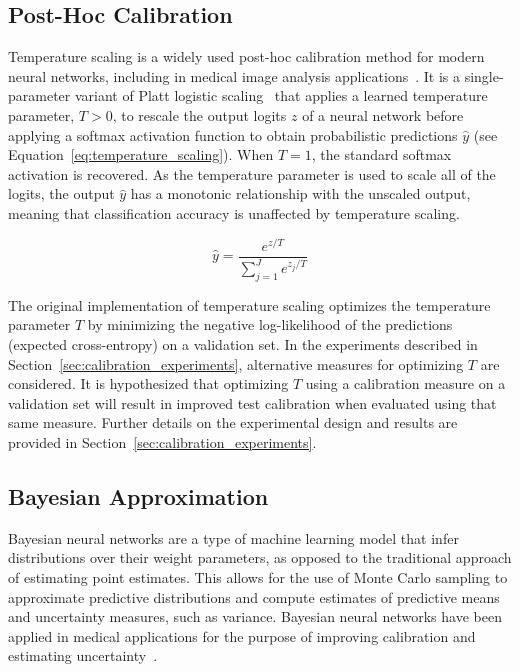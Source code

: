 \subsection{Post-Hoc Calibration}
Temperature scaling is a widely used post-hoc calibration method for modern neural networks, including in medical image analysis applications~\cite{guo2017calibration,liang2020improved}. It is a single-parameter variant of Platt logistic scaling~\cite{platt1999probabilistic} that applies a learned temperature parameter, $T > 0$, to rescale the output logits $z$ of a neural network before applying a softmax activation function to obtain probabilistic predictions $\hat{y}$ (see Equation~\ref{eq:temperature_scaling}). When $T=1$, the standard softmax activation is recovered. As the temperature parameter is used to scale all of the logits, the output $\hat{y}$ has a monotonic relationship with the unscaled output, meaning that classification accuracy is unaffected by temperature scaling.

\begin{equation}
	\hat{y} = \frac{e^{z/T}}{\sum^{J}_{j=1}e^{z_j/T}}
	\label{eq:temperature_scaling}
\end{equation}

The original implementation of temperature scaling optimizes the temperature parameter $T$ by minimizing the negative log-likelihood of the predictions (expected cross-entropy) on a validation set. In the experiments described in Section~\ref{sec:calibration_experiments}, alternative measures for optimizing $T$ are considered. It is hypothesized that optimizing $T$ using a calibration measure on a validation set will result in improved test calibration when evaluated using that same measure. Further details on the experimental design and results are provided in Section~\ref{sec:calibration_experiments}.


\subsection{Bayesian Approximation}
\label{subsec:bayesian_calibration}
Bayesian neural networks are a type of machine learning model that infer distributions over their weight parameters, as opposed to the traditional approach of estimating point estimates. This allows for the use of Monte Carlo sampling to approximate predictive distributions and compute estimates of predictive means and uncertainty measures, such as variance. Bayesian neural networks have been applied in medical applications for the purpose of improving calibration and estimating uncertainty~\cite{kwon2020uncertainty}.

